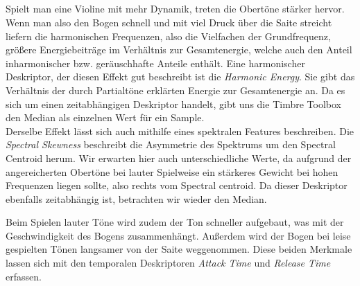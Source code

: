 \subsection{}
Spielt man eine Violine mit mehr Dynamik, treten die Obertöne stärker hervor.
Wenn man also den Bogen schnell und mit viel Druck über die Saite streicht liefern die harmonischen Frequenzen, also die Vielfachen der Grundfrequenz, größere Energiebeiträge im Verhältnis zur Gesamtenergie, welche auch den Anteil inharmonischer bzw. geräuschhafte Anteile enthält.  
Eine harmonischer Deskriptor, der diesen Effekt gut beschreibt ist die \textit{Harmonic Energy}.
Sie gibt das Verhältnis der durch Partialtöne erklärten Energie zur Gesamtenergie an.
Da es sich um einen zeitabhängigen Deskriptor handelt, gibt uns die Timbre Toolbox den Median als einzelnen Wert für ein Sample.\\ 
Derselbe Effekt lässt sich auch mithilfe eines spektralen Features beschreiben.
Die \textit{Spectral Skewness} beschreibt die Asymmetrie des Spektrums um den Spectral Centroid herum.
Wir erwarten hier auch unterschiedliche Werte, da aufgrund der angereicherten Obertöne bei lauter Spielweise ein stärkeres Gewicht bei hohen Frequenzen liegen sollte, also rechts vom Spectral centroid.
Da dieser Deskriptor ebenfalls zeitabhängig ist, betrachten wir wieder den Median.

Beim Spielen lauter Töne wird zudem der Ton schneller aufgebaut, was mit der Geschwindigkeit des Bogens zusammenhängt.
Außerdem wird der Bogen bei leise gespielten Tönen langsamer von der Saite weggenommen.
Diese beiden Merkmale lassen sich mit den temporalen Deskriptoren \textit{Attack Time} und \textit{Release Time} erfassen.

